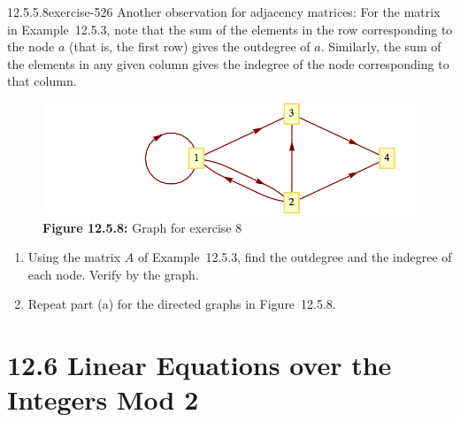 \documentclass[twoside,10pt,]{book}
\numberwithin{equation}{section}
\begin{document}
\begin{divisionsolution}{12.5.5.8}{}{exercise-526}%
\hypertarget{p-4722}{}%
Another observation for adjacency matrices: For the matrix in Example~12.5.3, note that the sum of the elements in the row corresponding to the node \(a\) (that is, the first row) gives the outdegree of \(a\). Similarly, the sum of the elements in any given column gives the indegree of the node corresponding to that column.%
\begin{figure}
\centering
\includegraphics[width=0.7\linewidth]{images/fig-graph-12-5-3.png}
\caption*{\textbf{Figure 12.5.8:} Graph for exercise 8}
\end{figure}
\hypertarget{p-4723}{}%
\leavevmode%
\begin{enumerate}[label=(\alph*)]
\item\hypertarget{li-2153}{}\hypertarget{p-4724}{}%
Using the matrix \(A\) of Example~12.5.3, find the outdegree and the indegree of each node. Verify by the graph.%
\item\hypertarget{li-2154}{}\hypertarget{p-4725}{}%
Repeat part (a) for the directed graphs in Figure~12.5.8.%
\end{enumerate}
%
\end{divisionsolution}%
\section*{12.6 Linear Equations over the Integers Mod 2}
\end{document}
